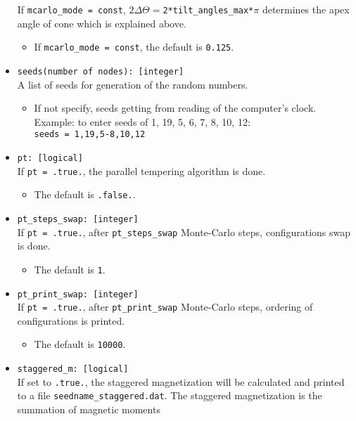 \documentclass[10pt]{report}
\begin{document}
\begin{itemize}
 If {\tt mcarlo\_mode = const}, $2\Delta\Theta = ${\tt 2*tilt\_angles\_max*$\pi$} determines the apex angle of cone which is explained above.
\begin{itemize} [label=\adfhalfrightarrowhead]
\item If {\tt mcarlo\_mode = const}, the default is {\tt 0.125}.
\end{itemize}
\item {\tt seeds(number of nodes): [integer]}              \\
A list of seeds for generation of the random numbers.
\begin{itemize} [label=\adfhalfrightarrowhead]
\item If not specify, seeds getting from  reading of the computer's clock.\\
 Example: to enter seeds of 1, 19, 5, 6, 7, 8, 10, 12:\\
{\tt seeds = 1,19,5-8,10,12}
\end{itemize}
\item {\tt pt: [logical]}            \\
If {\tt pt = .true.}, the parallel tempering algorithm is done.
\begin{itemize} [label=\adfhalfrightarrowhead]
\item  The default is {\tt .false.}.
\end{itemize}
\item {\tt pt\_steps\_swap: [integer]}                 \\
If {\tt pt = .true.}, after {\tt pt\_steps\_swap} Monte-Carlo steps, configurations swap is done.
\begin{itemize} [label=\adfhalfrightarrowhead]
\item The default is {\tt 1}.
\end{itemize}
\item {\tt pt\_print\_swap: [integer]}                 \\
If {\tt pt = .true.}, after {\tt pt\_print\_swap} Monte-Carlo steps, ordering of configurations is printed.
\begin{itemize} [label=\adfhalfrightarrowhead]
\item The default is {\tt 10000}.
\end{itemize}
\item {\tt staggered\_m: [logical]}                      \\
If set to {\tt .true.}, the staggered magnetization will be calculated and 
printed to a file {\tt seedname\_staggered.dat}. The staggered magnetization is the summation of magnetic moments 

\end{itemize}
\end{document}
